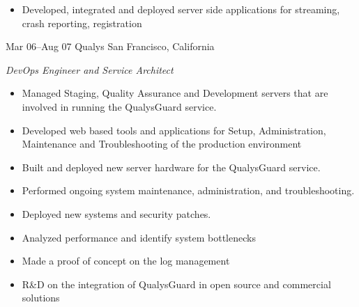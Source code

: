 \documentclass[]{friggeri-cv} %
\begin{document}
\begin{entrylist}
{\begin{itemize}
\item Developed, integrated and deployed server side applications for streaming, crash reporting, registration
\end{itemize}}
\entry
{Mar 06--Aug 07}
{Qualys}
{San Francisco, California}
{\emph{DevOps Engineer and Service Architect} \\
\begin{itemize}
\item Managed Staging, Quality Assurance and Development servers that are involved in running the QualysGuard service. 
\item Developed web based tools and applications for Setup, Administration, Maintenance and Troubleshooting of the production environment 
\item Built and deployed new server hardware for the QualysGuard service. 
\item Performed ongoing system maintenance, administration, and troubleshooting. 
\item Deployed new systems and security patches. 
\item Analyzed performance and identify system bottlenecks
\item Made a proof of concept on the log management 
\item R\&D on the integration of QualysGuard in open source and commercial solutions
\end{itemize}}
\end{entrylist}


\newpage


\end{document}
